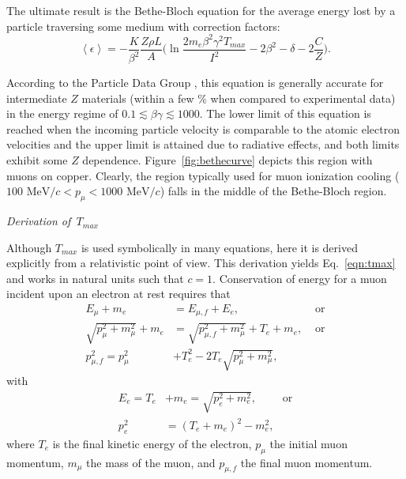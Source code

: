 The ultimate result is the Bethe-Bloch equation for the average energy lost by a particle traversing some medium with correction factors:
\begin{equation}\label{eqn:bethebloch}
\left< \epsilon \right> = -\frac{K}{\beta^2}\frac{Z\rho L}{A}\Big(\ln{\frac{2m_e \beta ^2 \gamma ^2 T_{max}}{I^2}}-2\beta^2-\delta-2\frac{C}{Z}\Big).
\end{equation}

According to the Particle Data Group \cite{PDG}, this equation is generally accurate for intermediate $Z$ materials (within a few \% when compared to experimental data) in the energy regime of $0.1 \lesssim \beta \gamma \lesssim 1000$. The lower limit of this equation is reached when the incoming particle velocity is comparable to the atomic electron velocities and the upper limit is attained due to radiative effects, and both limits exhibit some $Z$ dependence. Figure~\ref{fig:bethecurve} depicts this region with muons on copper. Clearly, the region typically used for muon ionization cooling ($100 \text{ MeV/}c < p_\mu < 1000 \text{ MeV/}c$) falls in the middle of the Bethe-Bloch region.

\vspace{24pt}
\newpage %
\noindent \textit{\large{Derivation of $\,T_{max}$}}
\vspace{12pt}

Although $T_{max}$ is used symbolically in many equations, here it is derived explicitly from a relativistic point of view. This derivation yields Eq.~\eqref{eqn:tmax} and works in natural units such that $c=1$. Conservation of energy for a muon incident upon an electron at rest requires that 
\begin{align}
E_\mu+m_e&=E_{\mu,f}+E_e,&\text{ or} \nonumber\\
\sqrt{p_\mu ^2+m_\mu ^2}+m_e &= \sqrt{p_{\mu,f}^2+m_\mu ^2}+T_e+m_e,&\text{ or} \nonumber \\
p_{\mu,f}^2 =p_\mu^2 &+T_e^2-2T_e\sqrt{p_\mu ^2 + m_\mu^2}, \label{eqn:TMaxEnergy1}
\end{align}
with
\begin{align}
E_e=T_e&+m_e = \sqrt{p_e ^2+m_e^2},\qquad\text{ or} \nonumber\\
p_e ^2&=(T_e+m_e)^2-m_e^2, \label{eqn:TMaxEnergy2}
\end{align}
where $T_e$ is the final kinetic energy of the electron, $p_\mu$ the initial muon momentum, $m_\mu$ the mass of the muon, and $p_{\mu,f}$ the final muon momentum. 

